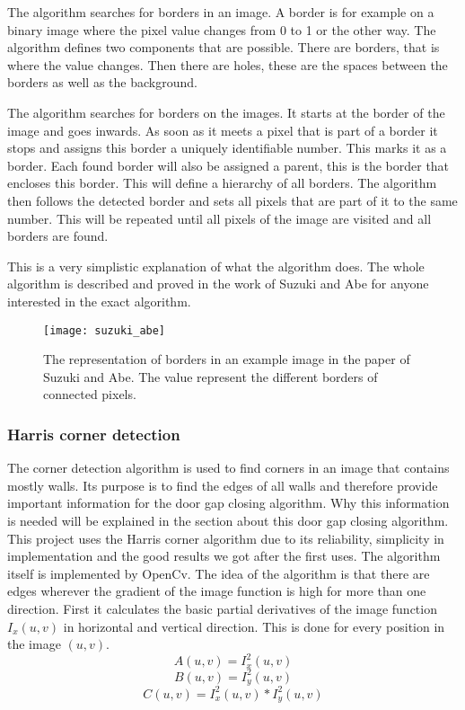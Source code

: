 The algorithm searches for borders in an image. A border is for example on a binary image where the pixel value changes from 0 to 1 or the other way. The algorithm defines two components that are possible. There are borders, that is where the value changes. Then there are holes, these are the spaces between the borders as well as the background.

The algorithm searches for borders on the images. It starts at the border of the image and goes inwards. As soon as it meets a pixel that is part of a border it stops and assigns this border a uniquely identifiable number. This marks it as a border. Each found border will also be assigned a parent, this is the border that encloses this border. This will define a hierarchy of all borders. The algorithm then follows the detected border and sets all pixels that are part of it to the same number. This will be repeated until all pixels of the image are visited and all borders are found.

This is a very simplistic explanation of what the algorithm does. The whole algorithm is described and proved in the work of Suzuki and Abe \citep{suzuki_abe_1985} for anyone interested in the exact algorithm.

\begin{figure}[H]
	\centering
	\texttt{[image: suzuki\_abe]}
	\caption{The representation of borders in an example image in the paper of Suzuki and Abe. The value represent the different borders of connected pixels.}
	\label{suzuki_abe}
\end{figure}


\subsubsection{Harris corner detection}
\label{subsubsec:HarrisCornerDetection}
The corner detection algorithm is used to find corners in an image that contains mostly walls. Its purpose is to find the edges of all walls and therefore provide important information for the door gap closing algorithm. Why this information is needed will be explained in the section about this door gap closing algorithm.
This project uses the Harris corner algorithm due to its reliability, simplicity in implementation and the good results we got after the first uses. The algorithm itself is implemented by OpenCv.
The idea of the algorithm is that there are edges wherever the gradient of the image function is high for more than one direction.
First it calculates the basic partial derivatives of the image function $I_{x}(u,v)$ in horizontal and vertical direction. This is done for every position in the image $(u,v)$.
\begin{equation}A(u,v) = I_{x}^2(u,v)\end{equation}
\begin{equation}B(u,v) = I_{y}^2(u,v)\end{equation}
\begin{equation}C(u,v) = I_{x}^2(u,v) * I_{y}^2(u,v)\end{equation}

